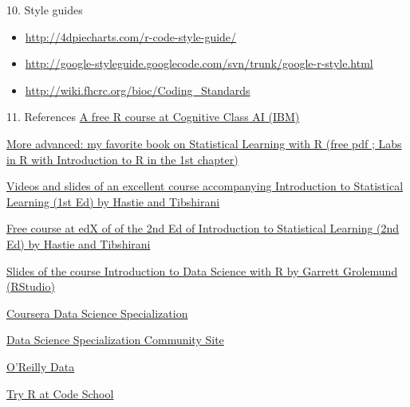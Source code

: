 \documentclass[
  ignorenonframetext,
]{beamer}
\providecommand{\tightlist}{%
  \setlength{\itemsep}{0pt}\setlength{\parskip}{0pt}}
\begin{document}
\begin{frame}{10. Style guides}
\protect\hypertarget{style-guides}{}
\begin{itemize}
\tightlist
\item
  \url{http://4dpiecharts.com/r-code-style-guide/}
\item
  \url{http://google-styleguide.googlecode.com/svn/trunk/google-r-style.html}
\item
  \url{http://wiki.fhcrc.org/bioc/Coding_Standards}
\end{itemize}
\end{frame}

\begin{frame}{11. References}
\protect\hypertarget{references}{}
\href{https://cognitiveclass.ai/courses/r-101}{A free R course at
Cognitive Class AI (IBM)}

\href{https://www.statlearning.com/}{More advanced: my favorite book on
Statistical Learning with R (free pdf ; Labs in R with Introduction to R
in the 1st chapter)}

\href{https://www.dataschool.io/15-hours-of-expert-machine-learning-videos/}{Videos
and slides of an excellent course accompanying Introduction to
Statistical Learning (1st Ed) by Hastie and Tibshirani}

\href{https://www.edx.org/course/statistical-learning}{Free course at
edX of of the 2nd Ed of Introduction to Statistical Learning (2nd Ed) by
Hastie and Tibshirani}

\href{https://github.com/rstudio/Intro/tree/master/slides}{Slides of the
course Introduction to Data Science with R by Garrett Grolemund
(RStudio)}

\href{https://www.coursera.org/specialization/jhudatascience/1?utm_medium=listingPage}{Coursera
Data Science Specialization}

\href{http://datasciencespecialization.github.io/}{Data Science
Specialization Community Site}

\href{http://www.oreilly.com/data/}{O'Reilly Data}

\href{http://tryr.codeschool.com/}{Try R at Code School}
\end{frame}
\end{document}
